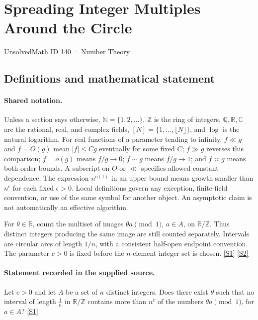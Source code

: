 \documentclass[11pt,a4paper]{article}
\newcommand{\N}{\mathbb{N}}
\newcommand{\Z}{\mathbb{Z}}
\newcommand{\Q}{\mathbb{Q}}
\newcommand{\R}{\mathbb{R}}
\newcommand{\C}{\mathbb{C}}
\newcommand{\sref}[2]{\hyperlink{source:#1:#2}{[S#2]}}
\begin{document}

\setcounter{section}{139}

\section{Spreading Integer Multiples Around the Circle}\label{140}

{\small\sffamily UnsolvedMath ID 140 · Number Theory}

\subsection{Definitions and mathematical statement}

\paragraph{Shared notation.}Unless a section says otherwise, $\N=\{1,2,\ldots\}$,
$\Z$ is the ring of integers, $\Q,\R,\C$ are the rational, real, and complex
fields, $[N]=\{1,\ldots,\lfloor N\rfloor\}$, and $\log$ is the natural
logarithm. For real functions of a parameter tending to infinity,
$f\ll g$ and $f=O(g)$ mean $|f|\leq Cg$ eventually for some fixed $C$;
$f\gg g$ reverses this comparison; $f=o(g)$ means $f/g\to0$;
$f\sim g$ means $f/g\to1$; and $f\asymp g$ means both order bounds.
A subscript on $O$ or $\ll$ specifies allowed constant dependence.
The expression $n^{o(1)}$ in an upper bound means growth smaller than
$n^\epsilon$ for each fixed $\epsilon>0$. Local definitions govern any
exception, finite-field convention, or use of the same symbol for another
object. An asymptotic claim is not automatically an effective algorithm.



For $\theta\in\R$, count the multiset of images $\theta a\pmod1$, $a\in A$, on $\R/\Z$. Thus distinct integers producing the same image are still counted separately. Intervals are circular arcs of length $1/n$, with a consistent half-open endpoint convention. The parameter $c>0$ is fixed before the $n$-element integer set is chosen. \sref{140}{1} \sref{140}{2}

\paragraph{Statement recorded in the supplied source.}
Let $c > 0$ and let $A$ be a set of $n$ distinct integers. Does there exist $\theta$ such that no interval of length $\frac{1}{n}$ in $\mathbb{R}/\mathbb{Z}$ contains more than $n^c$ of the numbers $\theta a \pmod 1$, for $a \in A$? \sref{140}{1}
\end{document}
